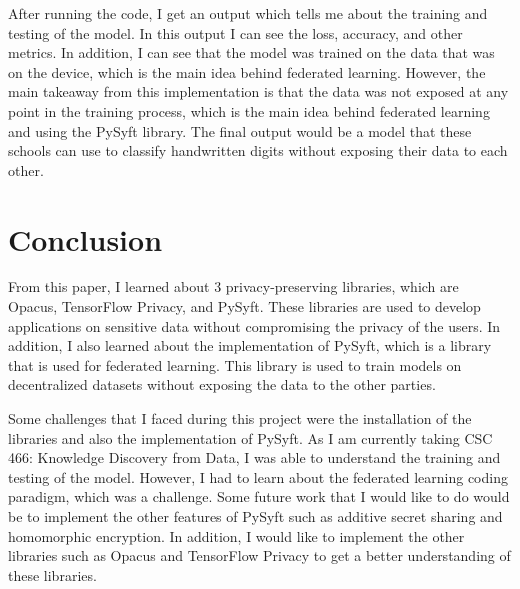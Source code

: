 \documentclass[conference]{IEEEtran}
\begin{document}
After running the code, I get an output which tells me about the training and
testing of the model. In this output I can see the loss, accuracy, and other
metrics. In addition, I can see that the model was trained on the data that was
on the device, which is the main idea behind federated learning. However, the
main takeaway from this implementation is that the data was not exposed at
any point in the training process, which is the main idea behind federated
learning and using the PySyft library. The final output would be a model that
these schools can use to classify handwritten digits without exposing their
data to each other.


\section{Conclusion}

From this paper, I learned about 3 privacy-preserving libraries, which are
Opacus, TensorFlow Privacy, and PySyft. These libraries are used to develop
applications on sensitive data without compromising the privacy of the users.
In addition, I also learned about the implementation of PySyft, which is a
library that is used for federated learning. This library is used to train
models on decentralized datasets without exposing the data to the other
parties.

Some challenges that I faced during this project were the installation of the
libraries and also the implementation of PySyft. As I am currently taking
CSC 466: Knowledge Discovery from Data, I was able to understand the training
and testing of the model. However, I had to learn about the federated learning
coding paradigm, which was a challenge. Some future work that I would like to
do would be to implement the other features of PySyft such as additive secret
sharing and homomorphic encryption. In addition, I would like to implement the
other libraries such as Opacus and TensorFlow Privacy to get a better
understanding of these libraries.
\end{document}
